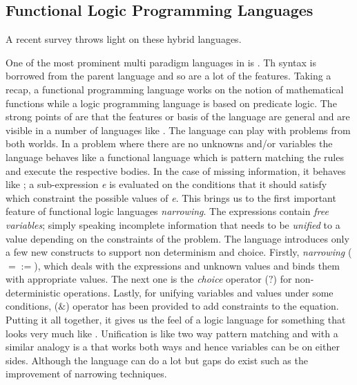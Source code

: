 \documentclass[thesis-solanki.tex]{subfiles}
\begin{document}
\subsection{Functional Logic Programming Languages}

A recent survey \cite{hanus2007multi} throws light on these hybrid languages. 

One of the most prominent multi paradigm languages in  is 
\cite{antoy2010functional}.
Th syntax is borrowed from the parent language and so are a lot of the features.
Taking a recap, a functional programming language works on the notion of mathematical functions while a logic
programming language is based on predicate logic.
The strong points of  are that the features or basis of the language are general and are visible in
a number of languages like \cite{website:toy}.
The language can play with problems from both worlds.
In a problem where there are no unknowns and/or variables the language behaves like a functional language which is
pattern matching the rules and execute the respective bodies.
In the case of missing information, it behaves like ; a sub-expression \textit{e} is evaluated on
the conditions that it should satisfy which constraint the possible values of \textit{e}.
This brings us to the first important feature of functional logic languages \textit{narrowing}.
The expressions contain \textit{free variables}; simply speaking incomplete information that needs to be
\textit{unified} to a value depending on the constraints of the problem.
The language introduces only a few new constructs to support non determinism and choice.
Firstly, \textit{narrowing} ($\mathtt{=:=}$), which deals with the expressions and unknown values and binds them
with appropriate values.
The next one is the \textit{choice} operator ($\mathtt{?}$) for non-deterministic operations.
Lastly, for unifying variables and values under some conditions, ($\mathtt{\&}$) operator has been provided to add
constraints to the equation.
Putting it all together, it gives us the feel of a logic language for something that looks very much like
.
Unification is like two way pattern matching and with a similar analogy  is a 
that works both ways and hence variables can be on either sides.
Although the language can do a lot but gaps do exist such as the improvement of narrowing techniques.
 
 
\end{document}
